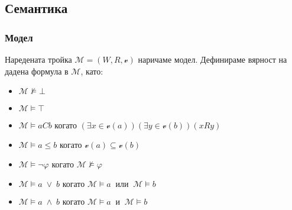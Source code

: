 \documentclass{beamer}
\begin{document}
\subsection{Семантика}
\begin{frame}\frametitle{Модел}
	Наредената тройка $\mathcal{M} = (W, R, \mathscr{v})$ наричаме модел. Дефинираме вярност на дадена формула в $\mathcal{M}$, като:
		\begin{itemize}
			\item $\mathcal{M} \not\models \bot$ 
			\item $\mathcal{M} \models \top$
			\item $\mathcal{M} \models aCb \text{ когато } (\exists x \in \mathscr{v}(a)) (\exists y \in \mathscr{v}(b)) (xRy)$
			\item $\mathcal{M} \models a \leq b \text{ когато } \mathscr{v}(a) \subseteq \mathscr{v}(b)$
			\item $\mathcal{M} \models \neg \varphi \text{ когато } \mathcal{M} \not\models \varphi$
			\item $\mathcal{M} \models a \; \vee \; b \text{ когато } \mathcal{M} \models a \: \textit{ или } \: \mathcal{M} \models b$
			\item $\mathcal{M} \models a \; \wedge \; b \text{ когато } \mathcal{M} \models a \: \textit{ и } \: \mathcal{M} \models b$
		\end{itemize}
	
\end{frame}
\end{document}
